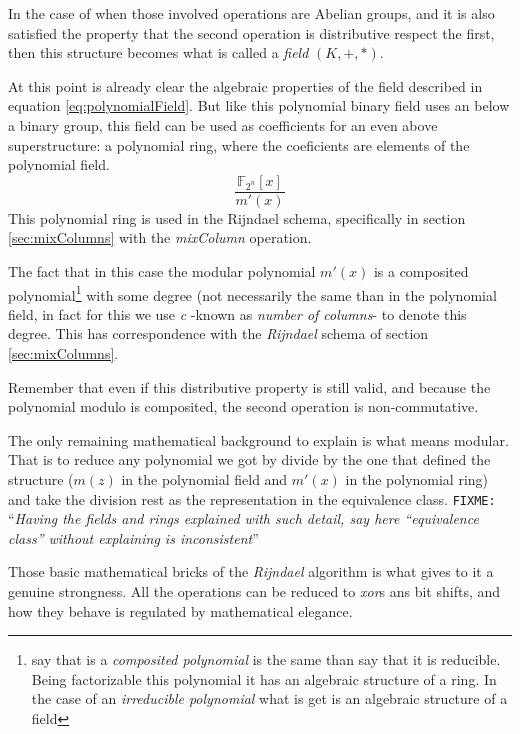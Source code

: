 \documentclass[10pt,a4paper,twoside]{llncs}
\newcommand{\fixme}[1]{\texttt{\color{red}FIXME:} ``\emph{#1}''}
\newcommand{\Fpn}[2]{\ensuremath{\mathbb{F}_{#1^#2}}}
\begin{document}
In the case of when those involved operations are Abelian groups, and it is also satisfied the property that the second operation is distributive respect the first, then this structure becomes what is called a \emph{field} $(K,+,*)$.

At this point is already clear the algebraic properties of the field described in equation \ref{eq:polynomialField}. But like this polynomial binary field uses an below a binary group, this field can be used as coefficients for an even above superstructure: a polynomial ring, where the coeficients are elements of the polynomial field.
\begin{equation}\label{eq:polynomialRing}
\frac{\Fpn{2}{n}[x]}{m'(x)}
\end{equation}
This polynomial ring is used in the Rijndael schema, specifically in section \ref{sec:mixColumns} with the \emph{mixColumn} operation.

The fact that in this case the modular polynomial $m'(x)$ is a composited polynomial\footnote{say that is a \emph{composited polynomial} is the same than say that it is reducible. Being factorizable this polynomial it has an algebraic structure of a ring. In the case of an \emph{irreducible polynomial} what is get is an algebraic structure of a field} with some degree (not necessarily the same than in the polynomial field, in fact for this we use \emph{c} -known as \emph{number of columns}- to denote this degree. This has correspondence with the \emph{Rijndael} schema of section \ref{sec:mixColumns}.

Remember that even if this distributive property is still valid, and because the polynomial modulo is composited, the second operation is non-commutative.

The only remaining mathematical background to explain is what means modular. That is to reduce any polynomial we got by divide by the one that defined the structure ($m(z)$ in the polynomial field and $m'(x)$ in the polynomial ring) and take the division rest as the representation in the equivalence class. \fixme{Having the fields and rings explained with such detail, say here ``equivalence class'' without explaining is inconsistent}

Those basic mathematical bricks of the \emph{Rijndael} algorithm is what gives to it a genuine strongness. All the operations can be reduced to \emph{xor}s ans bit shifts, and how they behave is regulated by mathematical elegance. 

\end{document}
